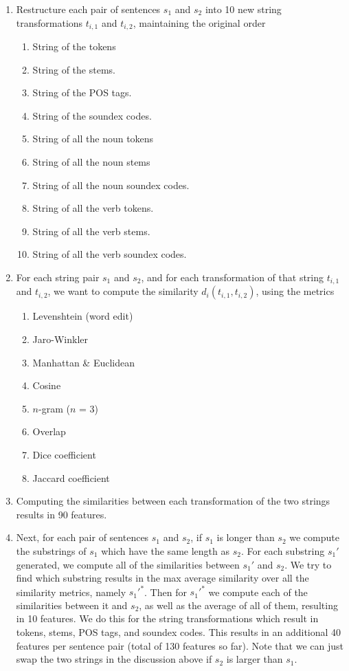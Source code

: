 \documentclass[11pt, reqno]{amsart}
\begin{document}
	\begin{enumerate}
	\item Restructure each pair of sentences $s_1$ and $s_2$ into 10 new string transformations $t_{i,1}$ and $t_{i,2}$, maintaining the original order
		\begin{multicols}{2}
		\begin{enumerate}
			\item String of the tokens
			\item String of the stems.
			\item String of the POS tags.
			\item String of the soundex codes\cite{soundex}.
			\item String of all the noun tokens
			\item String of all the noun stems
			\item String of all the noun soundex codes.
			\item String of all the verb tokens.
			\item String of all the verb stems.
			\item String of all the verb soundex codes.
		\end{enumerate}
		\end{multicols}
	\item For each string pair $s_1$ and $s_2$, and for each transformation of that string $t_{i,1}$ and $t_{i,2}$, we want to compute the similarity $d_i(t_{i,1},t_{i,2})$, using the metrics 
		\begin{multicols}{2}
		\begin{enumerate}
		\item Levenshtein (word edit)
		\item Jaro-Winkler
		\item Manhattan \& Euclidean
		\item Cosine
		\item $n$-gram ($n$ = 3)
		\item Overlap
		\item Dice coefficient
		\item Jaccard coefficient 
		\end{enumerate}
		\end{multicols}
	\item Computing the similarities between each transformation of the two strings results in 90 features. 
	\item Next, for each pair of sentences $s_1$ and $s_2$, if $s_1$ is longer than $s_2$ we compute the substrings of $s_1$ which have the same length as $s_2$. For each substring $s_1'$ generated, we compute all of the similarities between $s_1'$ and $s_2$. We try to find which substring results in the max average similarity over all the similarity metrics, namely $s_1'^*$. Then for $s_1'^*$ we compute each of the similarities between it and $s_2$, as well as the average of all of them, resulting in 10 features. We do this for the string transformations which result in tokens, stems, POS tags, and soundex codes. This results in an additional 40 features per sentence pair (total of 130 features so far). Note that we can just swap the two strings in the discussion above if $s_2$ is larger than $s_1$. 
	

\end{enumerate}
\end{document}
